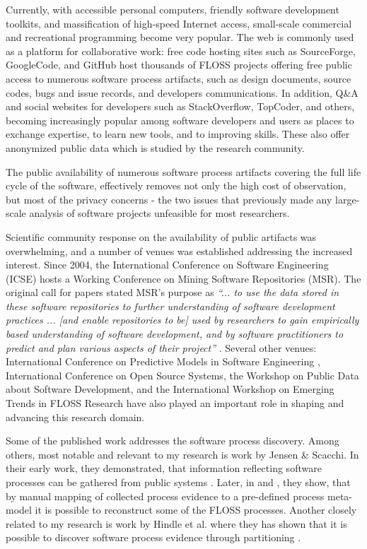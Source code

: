 Currently, with accessible personal computers, friendly software development toolkits, and massification of 
high-speed Internet access, small-scale commercial and recreational programming become very popular. 
The web is commonly used as a platform for collaborative work: free code hosting sites such as SourceForge, 
GoogleCode, and GitHub host thousands of FLOSS projects offering free public access to numerous software 
process artifacts, such as design documents, source codes, bugs and issue records, and developers communications.
In addition, Q\&A and social websites for developers such as StackOverflow, TopCoder, and others, becoming 
increasingly popular among software developers and users as places to exchange expertise, to learn new tools, 
and to improving skills. These also offer anonymized public data which is studied by the research community.

The public availability of numerous software process artifacts covering the full life cycle of the software,
effectively removes not only the high cost of observation, but most of the privacy concerns - the two issues 
that previously made any large-scale analysis of software projects unfeasible for most researchers.

Scientific community response on the availability of public artifacts was overwhelming, and a number of 
venues was established addressing the increased interest. 
Since 2004, the International Conference on Software Engineering (ICSE) hosts a Working Conference on 
Mining Software Repositories (MSR). The original call for papers stated MSR's purpose as 
\textit{``... to use the data stored in these software repositories to further understanding of software 
development practices ... [and enable repositories to be] used by researchers to gain empirically based 
understanding of software development, and by software practitioners to predict and plan various aspects 
of their project''} \cite{msr2004} \cite{citeulike:7853299}. 
Several other venues: International Conference on Predictive Models in Software Engineering \cite{promise12}, 
International Conference on Open Source Systems, the Workshop on Public Data about Software Development, 
and the International Workshop on Emerging Trends in FLOSS Research have also played
an important role in shaping and advancing this research domain.

Some of the published work addresses the software process discovery. Among others, most notable and 
relevant to my research is work by Jensen \& Scacchi. In their early work, they demonstrated, that 
information reflecting software processes can be gathered from public systems \cite{citeulike:12550640}. 
Later, in \cite{citeulike:5043664} and \cite{citeulike:5128808}, they show, that by manual mapping of 
collected process evidence to a pre-defined process meta-model it is possible to reconstruct some 
of the FLOSS processes. 
Another closely related to my research is work by Hindle et al. where they has shown that it is possible to 
discover software process evidence through partitioning \cite{citeulike:10377366}.

